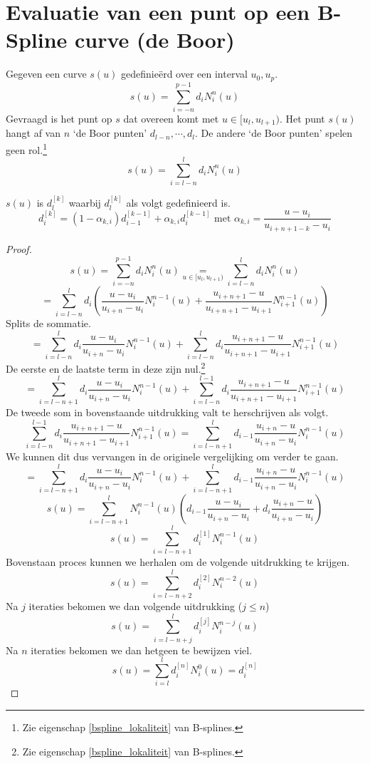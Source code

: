 \documentclass[computergesteund_ontwerp_van_curven_en_oppervlakken.tex]{subfiles}
\begin{document}
\section{Evaluatie van een punt op een B-Spline curve (de Boor)}
Gegeven een curve $s(u)$ gedefinie\"erd over een interval $u_0,u_p$. 
\[
s(u) = \sum_{i=-n}^{p-1}d_iN_{i}^{n}(u)
\]
Gevraagd is het punt op $s$ dat overeen komt met $u\in [u_l,u_{l+1})$. Het punt $s(u)$ hangt af van $n$ `de Boor punten' $d_{l-n},\cdots,d_{l}$. De andere `de Boor punten' spelen geen rol.\footnote{Zie eigenschap \ref{bspline_lokaliteit} van B-splines.}
\[
s(u) = \sum_{i=l-n}^{l}d_{i}N_{i}^{n}(u)
\]
\begin{st}
$s(u)$ is $d_{l}^{[k]}$ waarbij $d_{l}^{[k]}$ als volgt gedefinieerd is.
\[
d_{i}^{[k]}
= (1-\alpha_{k,i})d_{i-1}^{[k-1]}
+ \alpha_{k,i}d_{i}^{[k-1]}
\text{ met }
\alpha_{k,i} = \frac{u-u_i}{u_{i+n+1-k}-u_{i}}
\]

\begin{proof}
\[
s(u)
= \sum_{i=-n}^{p-1}d_iN_{i}^{n}(u)
\underset{u \in [u_l,u_{l+1})}{=}
\sum_{i=l-n}^{l}d_iN_{i}^{n}(u)
\]
\[
=
\sum_{i=l-n}^{l}d_i
\left(
\frac{u-u_i}{u_{i+n}-u_i}N_i^{n-1}(u) + 
\frac{u_{i+n+1}-u}{u_{i+n+1}-u_{i+1}}N_{i+1}^{n-1}(u)
\right)
\]
Splits de sommatie.
\[
=
\sum_{i=l-n}^{l}d_i
\frac{u-u_i}{u_{i+n}-u_i}N_i^{n-1}(u) + 
\sum_{i=l-n}^{l}d_i
\frac{u_{i+n+1}-u}{u_{i+n+1}-u_{i+1}}N_{i+1}^{n-1}(u)
\]
De eerste en de laatste term in deze zijn nul.\footnote{Zie eigenschap \ref{bspline_lokaliteit} van B-splines.}
\[
=
\sum_{i=l-n+1}^{l}d_i
\frac{u-u_i}{u_{i+n}-u_i}N_i^{n-1}(u) + 
\sum_{i=l-n}^{l-1}d_i
\frac{u_{i+n+1}-u}{u_{i+n+1}-u_{i+1}}N_{i+1}^{n-1}(u)
\]
De tweede som in bovenstaande uitdrukking valt te herschrijven als volgt.
\[
\sum_{i=l-n}^{l-1}d_i
\frac{u_{i+n+1}-u}{u_{i+n+1}-u_{i+1}}N_{i+1}^{n-1}(u)
=
\sum_{i=l-n+1}^{l}d_{i-1}
\frac{u_{i+n}-u}{u_{i+n}-u_{i}}N_{i}^{n-1}(u)
\]
We kunnen dit dus vervangen in de originele vergelijking om verder te gaan.
\[
=
\sum_{i=l-n+1}^{l}d_i
\frac{u-u_i}{u_{i+n}-u_i}N_i^{n-1}(u) + 
\sum_{i=l-n+1}^{l}d_{i-1}
\frac{u_{i+n}-u}{u_{i+n}-u_{i}}N_{i}^{n-1}(u)
\]
\[
s(u)
=
\sum_{i=l-n+1}^{l}
N_i^{n-1}(u)
\left(
d_{i-1}
\frac{u-u_i}{u_{i+n}-u_i} +
d_i
\frac{u_{i+n}-u}{u_{i+n}-u_{i}}
\right)
\]
\[
s(u)
= \sum_{i=l-n+1}^{l}
d_{i}^{[1]}
N_i^{n-1}(u)
\]
Bovenstaan proces kunnen we herhalen om de volgende uitdrukking te krijgen.
\[
s(u)
= \sum_{i=l-n+2}^{l}
d_{i}^{[2]}
N_i^{n-2}(u)
\]
Na $j$ iteraties bekomen we dan volgende uitdrukking ($j\le n$)
\[
s(u)
= \sum_{i=l-n+j}^{l}
d_{i}^{[j]}
N_i^{n-j}(u)
\]
Na $n$ iteraties bekomen we dan hetgeen te bewijzen viel.
\[
s(u) = \sum_{i=l}^{l}d_{i}^{[n]}N_{i}^{0}(u) = d_{i}^{[n]}
\]
\end{proof}
\end{st}
\end{document}
